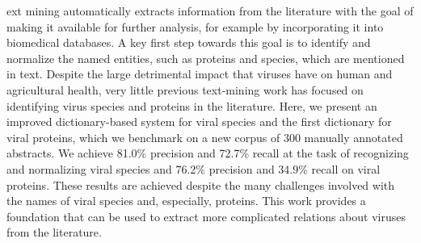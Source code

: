 ext mining automatically extracts information from the literature with the goal of making it available for further analysis, for example by incorporating it into biomedical databases.  A key first step towards this goal is to identify and normalize the named entities, such as proteins and species, which are mentioned in text.  Despite the large detrimental impact that viruses have on human and agricultural health, very little previous text-mining work has focused on identifying virus species and proteins in the literature.  Here, we present an improved dictionary-based system for viral species and the first dictionary for viral proteins, which we benchmark on a new corpus of 300 manually annotated abstracts.  We achieve 81.0\% precision and 72.7\% recall at the task of recognizing and normalizing viral species and 76.2\% precision and 34.9\% recall on viral proteins.  These results are achieved despite the many challenges involved with the names of viral species and, especially, proteins. This work provides a foundation that can be used to extract more complicated relations about viruses from the literature.
